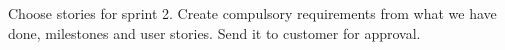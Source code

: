 \nextItem Choose stories for sprint 2.
\nextItem Create compulsory requirements from what we have done, milestones and user stories. Send it to customer for approval.

